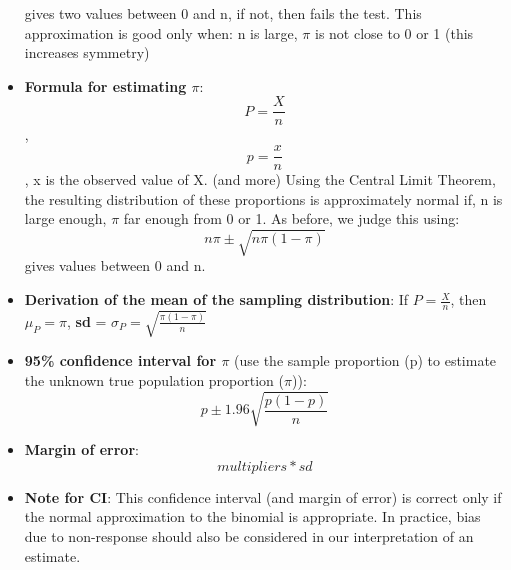 \documentclass[12pt]{book}
\begin{document}
\begin{itemize}
gives two values between 0 and n, if not, then fails the test. This approximation is good only when: n is large, $\pi$ is not close to 0 or 1 (this increases symmetry)
\item \textbf{Formula for estimating $\pi$}: $$P = \frac{X}{n}$$, $$p = \frac{x}{n}$$, x is the observed value of X. (and more) Using the Central Limit Theorem, the resulting distribution of these proportions is approximately normal if, n is large enough, $\pi$ far enough from 0 or 1. As before, we judge this using: $$n\pi \pm \sqrt{n\pi(1 - \pi)}$$ gives values between 0 and n.
\item \textbf{Derivation of the mean of the sampling distribution}: If \(P = \frac{X}{n}\), then \(\mu_P = \pi\), \textbf{sd} = \(\sigma_P = \sqrt{\frac{\pi(1 - \pi)}{n}}\)
\item \textbf{95\% confidence interval for $\pi$} (use the sample proportion (p) to estimate the unknown true population proportion ($\pi$)): $$p \pm 1.96 \sqrt{\frac{p(1 - p)}{n}}$$
\item \textbf{Margin of error}: $$multipliers * sd$$
\item \textbf{Note for CI}: This confidence interval (and margin of error) is correct only if the normal approximation to the binomial is appropriate. In practice, bias due to non-response should also be considered in our interpretation of an estimate.
\end{itemize}


\newpage

\pagestyle{fancy}
\end{document}
